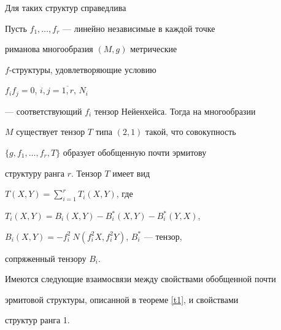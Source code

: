 Для таких структур справедлива





\begin{thm}\label{t1}


Пусть $f_1,\dotsc,f_r$ --- линейно независимые в каждой точке


риманова многообразия $(M,g)$ метрические


$f$-структуры, удовлетворяющие условию


$f_if_j=0$, $i,j=\overline{1,r}$, $N_i$


--- соответствующий $f_i$ тензор Нейенхейса. Тогда на многообразии


$M$ существует тензор $T$ типа $(2,1)$ такой, что совокупность


$\{g,f_1,\dotsc,f_r,T\}$ образует обобщенную почти эрмитову


структуру ранга $r$. Тензор $T$ имеет вид


$T(X,Y)=\sum\limits_{i=1}^rT_i(X,Y)$, где


$T_i(X,Y)=B_i(X,Y)-B_i^*(X,Y)-B_i^*(Y,X)$,


$B_i(X,Y)=-f_i^2\:N(f_i^2X,f_i^2Y)$, $B_i^*$ --- тензор,


сопряженный тензору $B_i$.


\end{thm}














Имеются следующие взаимосвязи между свойствами обобщенной почти


эрмитовой структуры, описанной в теореме \ref{t1}, и свойствами


структур ранга 1.





